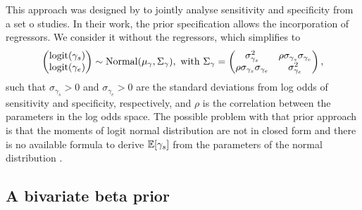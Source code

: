 This approach was designed by \textcite{chu2006bivariate} to jointly analyse
sensitivity and specificity from a set o studies. In their work, the prior
specification allows the incorporation of regressors. We consider it without
the regressors, which simplifies to
\begin{equation*}
  \begin{pmatrix}
    \operatorname{logit}(\gamma_s) \\
    \operatorname{logit}(\gamma_e)
  \end{pmatrix}
  \sim \operatorname{Normal}(\mu_{\gamma}, \Sigma_{\gamma}), \text{ with } \Sigma_{\gamma} =
  \begin{pmatrix}
    \sigma_{\gamma_s}^2                    & \rho\sigma_{\gamma_s}\sigma_{\gamma_e} \\
    \rho\sigma_{\gamma_s}\sigma_{\gamma_e} & \sigma_{\gamma_e}^2
  \end{pmatrix},
\end{equation*}
such that $\sigma_{\gamma_s} > 0$ and $\sigma_{\gamma_e} > 0$ are the
standard deviations from log odds of sensitivity and specificity,
respectively, and $\rho$ is the correlation between the parameters in the log
odds space. The possible problem with that prior approach is that the moments
of logit normal distribution are not in closed form and there is no available
formula to derive $\mathbb{E}[\gamma_s]$ from the parameters of the normal
distribution \cite{kurt2021logit}.

\subsection{A bivariate beta prior}

